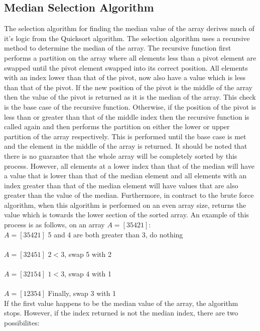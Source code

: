 \documentclass{article}
\begin{document}
    \subsection{Median Selection Algorithm}
        The selection algorithm for finding the median value of the array derives much of it's logic from the Quicksort algorithm. The selection algorithm uses a recursive method to determine the median of the array. 
        The recursive function first performs a partition on the array where all elements less than a pivot element are swapped until the pivot element swapped into its correct position. All elements with an index lower than that of the pivot, now also have a value which is less than that of the pivot. If the new position of the pivot is the middle of the array then the value of the pivot is returned as it is the median of the array. This check is the base case of the recursive function.
        Otherwise, if the position of the pivot is less than or greater than that of the middle index then the recursive function is called again and then performs the partition on either the lower or upper partition of the array respectively. This is performed until the base case is met and the element in the middle of the array is returned.
        It should be noted that there is no guarantee that the whole array will be completely sorted by this process. However, all elements at a lower index than that of the median will have a value that is lower than that of the median element and all elements with an index greater than that of the median element will have values that are also greater than the value of the median.
        Furthermore, in contract to the brute force algorithm, when this algorithm is performed on an even array size, returns the value which is towards the lower section of the sorted array.
        An example of this process is as follows, on an array $A = [3 5 4 2 1]$:\\

        \noindent$A = [3 5 4 2 1]$ 5 and 4 are both greater than 3, do nothing\\\\
        $A = [3 2 4 5 1]$ $2 < 3$, swap 5 with 2\\\\
        $A = [3 2 1 5 4]$ $1 < 3$, swap 4 with 1\\\\
        $A = [1 2 3 5 4]$ Finally, swap 3 with 1\\

        If the first value happens to be the median value of the array, the algorithm stops. However, if the index returned is not the median index, there are two possibilites:
\end{document}
